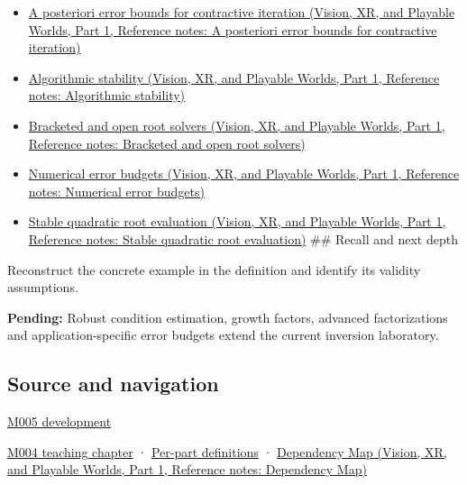 \begin{itemize}
\tightlist
\item
  \href{../07-Vision-XR-and-Playable-Worlds-P01/main.pdf\#appendix-d83b0ad1be7f}{A posteriori error bounds for contractive iteration (Vision, XR, and Playable Worlds, Part 1, Reference notes: A posteriori error bounds for contractive iteration)}
\item
  \href{../07-Vision-XR-and-Playable-Worlds-P01/main.pdf\#appendix-aa2bf0d79639}{Algorithmic stability (Vision, XR, and Playable Worlds, Part 1, Reference notes: Algorithmic stability)}
\item
  \href{../07-Vision-XR-and-Playable-Worlds-P01/main.pdf\#appendix-f63eb850796d}{Bracketed and open root solvers (Vision, XR, and Playable Worlds, Part 1, Reference notes: Bracketed and open root solvers)}
\item
  \href{../07-Vision-XR-and-Playable-Worlds-P01/main.pdf\#appendix-31b8c295e05f}{Numerical error budgets (Vision, XR, and Playable Worlds, Part 1, Reference notes: Numerical error budgets)}
\item
  \href{../07-Vision-XR-and-Playable-Worlds-P01/main.pdf\#appendix-b9afba7f63e5}{Stable quadratic root evaluation (Vision, XR, and Playable Worlds, Part 1, Reference notes: Stable quadratic root evaluation)} \#\# Recall and next depth
\end{itemize}

Reconstruct the concrete example in the definition and identify its validity assumptions.

\textbf{Pending:} Robust condition estimation, growth factors, advanced factorizations and application-specific error budgets extend the current inversion laboratory.

\subsection{Source and navigation}\label{appendix-8f6a01f284a7-source-and-navigation}

\hypertarget{appendix-8f6a01f284a7-source-and-navigation}{}

\hyperref[01-foundations-i-ch001-when-arithmetic-meets-uncertainty]{M005 development}

\hyperref[01-foundations-i-ch001-a-stretching-ruler-for-real-valued-quantities]{M004 teaching chapter} · \hyperref[appendix-fd090d982a15-m004---parts-61-76]{Per-part definitions} · \href{../07-Vision-XR-and-Playable-Worlds-P01/main.pdf\#appendix-4ad47bdd269a}{Dependency Map (Vision, XR, and Playable Worlds, Part 1, Reference notes: Dependency Map)}
